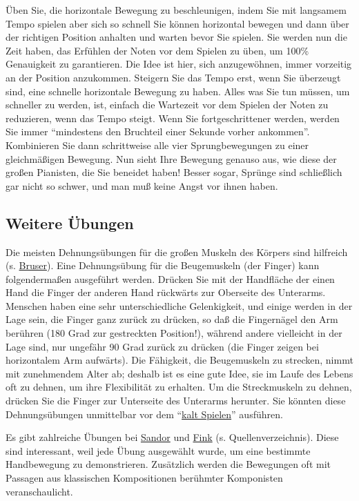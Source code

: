 Üben Sie, die horizontale Bewegung zu beschleunigen, indem Sie mit langsamem Tempo spielen aber sich so schnell Sie können horizontal bewegen und dann über der richtigen Position anhalten und warten bevor Sie spielen.
Sie werden nun die Zeit haben, das Erfühlen der Noten vor dem Spielen zu üben, um 100\% Genauigkeit zu garantieren.
Die Idee ist hier, sich anzugewöhnen, immer vorzeitig an der Position anzukommen.
Steigern Sie das Tempo erst, wenn Sie überzeugt sind, eine schnelle horizontale Bewegung zu haben.
Alles was Sie tun müssen, um schneller zu werden, ist, einfach die Wartezeit vor dem Spielen der Noten zu reduzieren, wenn das Tempo steigt.
Wenn Sie fortgeschrittener werden, werden Sie immer \enquote{mindestens den Bruchteil einer Sekunde vorher ankommen}.
Kombinieren Sie dann schrittweise alle vier Sprungbewegungen zu einer gleichmäßigen Bewegung.
Nun sieht Ihre Bewegung genauso aus, wie diese der großen Pianisten, die Sie beneidet haben!
Besser sogar, Sprünge sind schließlich gar nicht so schwer, und man muß keine Angst vor ihnen haben.
 

\subsection{Weitere Übungen}
\label{c1iii7g}

Die meisten Dehnungsübungen für die großen Muskeln des Körpers sind hilfreich (s. \hyperref[Bruser]{Bruser}).
Eine Dehnungsübung für die Beugemuskeln (der Finger) kann folgendermaßen ausgeführt werden.
Drücken Sie mit der Handfläche der einen Hand die Finger der anderen Hand rückwärts zur Oberseite des Unterarms.
Menschen haben eine sehr unterschiedliche Gelenkigkeit, und einige werden in der Lage sein, die Finger ganz zurück zu drücken, so daß die Fingernägel den Arm berühren (180 Grad zur gestreckten Position!), während andere vielleicht in der Lage sind, nur ungefähr 90 Grad zurück zu drücken (die Finger zeigen bei horizontalem Arm aufwärts).
Die Fähigkeit, die Beugemuskeln zu strecken, nimmt mit zunehmendem Alter ab; deshalb ist es eine gute Idee, sie im Laufe des Lebens oft zu dehnen, um ihre Flexibilität zu erhalten.
Um die Streckmuskeln zu dehnen, drücken Sie die Finger zur Unterseite des Unterarms herunter.
Sie könnten diese Dehnungsübungen unmittelbar vor dem \enquote{\hyperref[c1iii6g]{kalt Spielen}} ausführen.

 Es gibt zahlreiche Übungen bei \hyperref[Sandor]{Sandor} und \hyperref[Fink]{Fink} (s. Quellenverzeichnis).
Diese sind interessant, weil jede Übung ausgewählt wurde, um eine bestimmte Handbewegung zu demonstrieren.
Zusätzlich werden die Bewegungen oft mit Passagen aus klassischen Kompositionen berühmter Komponisten veranschaulicht.



